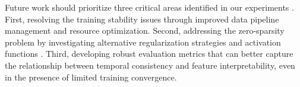 \documentclass{article} %
\begin{document}
Future work should prioritize three critical areas identified in our experiments \cite{goodfellow2016deep}. First, resolving the training stability issues through improved data pipeline management and resource optimization. Second, addressing the zero-sparsity problem by investigating alternative regularization strategies and activation functions \cite{vaswani2017attention}. Third, developing robust evaluation metrics that can better capture the relationship between temporal consistency and feature interpretability, even in the presence of limited training convergence.



\end{document}
